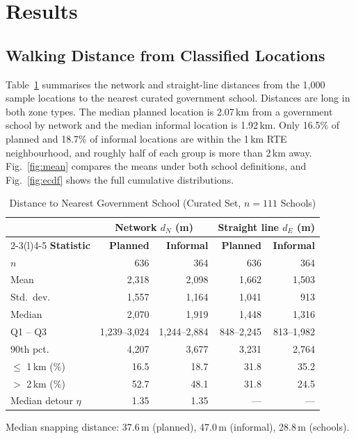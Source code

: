 \documentclass[conference]{IEEEtran}
\newcommand{\km}{\,km}
\newcommand{\m}{\,m}
\begin{document}
\section{Results}\label{sec:results}
\subsection{Walking Distance from Classified Locations}
Table~\ref{tab:desc} summarises the network and straight-line distances from the 1,000 sample locations to the nearest curated government school. Distances are long in both zone types. The median planned location is 2.07\km{} from a government school by network and the median informal location is 1.92\km{}. Only 16.5\% of planned and 18.7\% of informal locations are within the 1\km{} RTE neighbourhood, and roughly half of each group is more than 2\km{} away. Fig.~\ref{fig:mean} compares the means under both school definitions, and Fig.~\ref{fig:ecdf} shows the full cumulative distributions.

\begin{table}[!t]
\centering
\caption{Distance to Nearest Government School (Curated Set, $n=111$ Schools)}
\label{tab:desc}
\footnotesize
\begin{threeparttable}
\begin{tabular}{@{}lrrrr@{}}
\toprule
& \multicolumn{2}{c}{\textbf{Network $d_N$ (m)}} & \multicolumn{2}{c}{\textbf{Straight line $d_E$ (m)}} \\
\cmidrule(lr){2-3}\cmidrule(l){4-5}
\textbf{Statistic} & \textbf{Planned} & \textbf{Informal} & \textbf{Planned} & \textbf{Informal} \\
\midrule
$n$ & 636 & 364 & 636 & 364 \\
Mean & 2,318 & 2,098 & 1,662 & 1,503 \\
Std.\ dev. & 1,557 & 1,164 & 1,041 & 913 \\
Median & 2,070 & 1,919 & 1,448 & 1,316 \\
Q1 -- Q3 & 1,239--3,024 & 1,244--2,884 & 848--2,245 & 813--1,982 \\
90th pct. & 4,207 & 3,677 & 3,231 & 2,764 \\
$\le$ 1\km{} (\%) & 16.5 & 18.7 & 31.8 & 35.2 \\
$>$ 2\km{} (\%) & 52.7 & 48.1 & 31.8 & 24.5 \\
Median detour $\eta$ & 1.35 & 1.35 & --- & --- \\
\bottomrule
\end{tabular}
\begin{tablenotes}\footnotesize
\item Median snapping distance: 37.6\m{} (planned), 47.0\m{} (informal), 28.8\m{} (schools).
\end{tablenotes}
\end{threeparttable}
\end{table}
\end{document}

